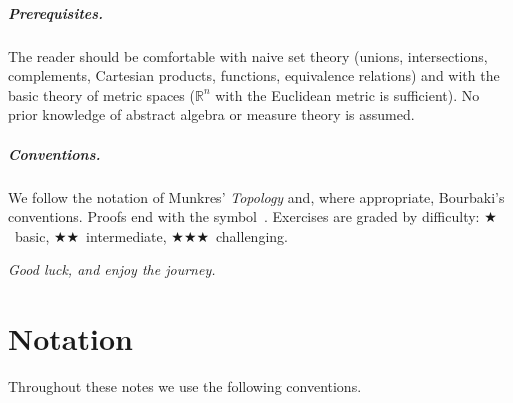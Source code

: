 \documentclass[11pt,a4paper,twoside]{book}
\theoremstyle{remark}
\theoremstyle{definition}
\theoremstyle{definition}
\newcommand{\R}{\mathbb{R}}
\begin{document}
\paragraph{Prerequisites.}
The reader should be comfortable with naive set theory (unions, intersections,
complements, Cartesian products, functions, equivalence relations) and with the
basic theory of metric spaces ($\R^n$ with the Euclidean metric is sufficient).
No prior knowledge of abstract algebra or measure theory is assumed.

\paragraph{Conventions.}
We follow the notation of Munkres' \emph{Topology} and, where appropriate,
Bourbaki's conventions.  Proofs end with the symbol~\qedsymbol.  Exercises are
graded by difficulty:
$\bigstar$~basic,
$\bigstar\!\bigstar$~intermediate,
$\bigstar\!\bigstar\!\bigstar$~challenging.

\bigskip
\hfill\textit{Good luck, and enjoy the journey.}

\chapter*{Notation}

Throughout these notes we use the following conventions.

\bigskip
\end{document}
